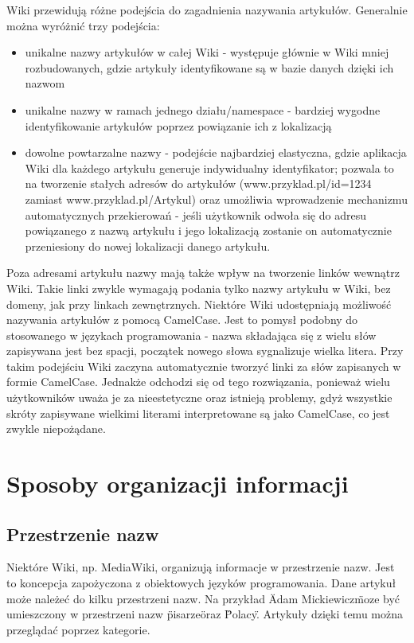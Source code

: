 \documentclass{article}
\begin{document}
Wiki przewidują różne podejścia do zagadnienia nazywania artykułów. Generalnie można wyróżnić trzy podejścia:
\begin{itemize}
\item unikalne nazwy artykułów w całej Wiki - występuje głównie w Wiki mniej rozbudowanych, gdzie artykuły identyfikowane są w bazie danych dzięki ich nazwom
\item unikalne nazwy w ramach jednego działu/namespace - bardziej wygodne identyfikowanie artykułów poprzez powiązanie ich z lokalizacją
\item dowolne powtarzalne nazwy - podejście najbardziej elastyczna, gdzie aplikacja Wiki dla każdego artykułu generuje indywidualny identyfikator; pozwala to na tworzenie stałych adresów do artykułów (www.przyklad.pl/id=1234 zamiast www.przyklad.pl/Artykul) oraz umożliwia wprowadzenie mechanizmu automatycznych przekierowań - jeśli użytkownik odwoła się do adresu powiązanego z nazwą artykułu i jego lokalizacją zostanie on automatycznie przeniesiony do nowej lokalizacji danego artykułu. 
\end{itemize}

Poza adresami artykułu nazwy mają także wpływ na tworzenie linków wewnątrz Wiki. Takie linki zwykle wymagają podania tylko nazwy artykułu w Wiki, bez domeny, jak przy linkach zewnętrznych. Niektóre Wiki udostępniają możliwość nazywania artykułów z pomocą CamelCase. Jest to pomysł podobny do stosowanego w językach programowania - nazwa składająca się z wielu słów zapisywana jest bez spacji, początek nowego słowa sygnalizuje wielka litera. Przy takim podejściu Wiki zaczyna automatycznie tworzyć linki za słów zapisanych w formie CamelCase. Jednakże odchodzi się od tego rozwiązania, ponieważ wielu użytkowników uważa je za nieestetyczne oraz istnieją problemy, gdyż wszystkie skróty zapisywane wielkimi literami interpretowane są jako CamelCase, co jest zwykle niepożądane.



\newpage
\section{Sposoby organizacji informacji}	
	\subsection{Przestrzenie nazw}
	

	Niektóre Wiki, np. MediaWiki, organizują informacje w przestrzenie nazw. Jest to koncepcja zapożyczona z obiektowych języków programowania. Dane artykuł może należeć do kilku przestrzeni nazw. Na przykład \"Adam Mickiewicz\" moze być umieszczony w przestrzeni nazw \"pisarze\" oraz \"Polacy\". Artykuły dzięki temu można przeglądać poprzez kategorie.   
 
\end{document}
